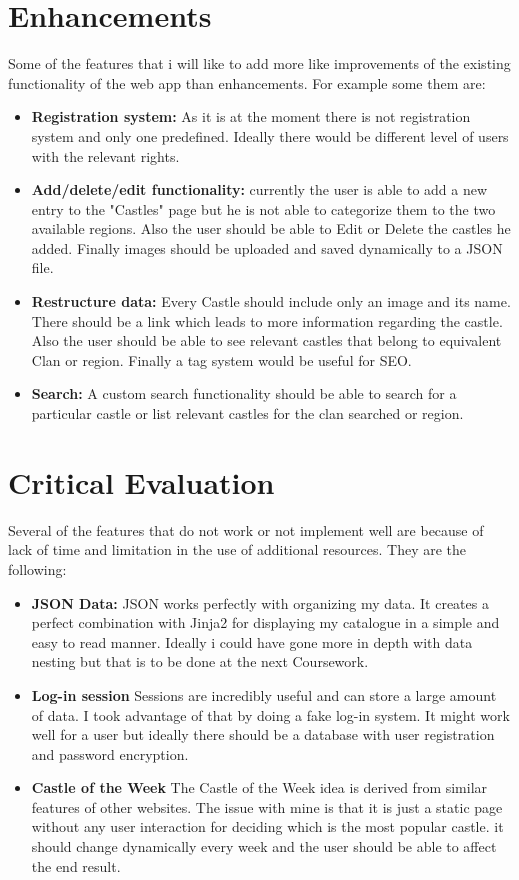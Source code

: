 \documentclass[10pt, a4paper]{article}
\begin{document}
	
	\section{Enhancements}
    
    Some of the features that i will like to add more like improvements of the existing functionality of the web app than enhancements. For  example some them are:
    \begin{itemize}
      \item \textbf{Registration system:} As it is at the moment there is not registration system and only one predefined. Ideally there would be different level of users with the relevant rights.
      \item \textbf{Add/delete/edit functionality:} currently the user is able to add a new entry to the "Castles" page but he is not able to categorize them to the two available regions. Also the user should be able to Edit or Delete the castles he added. Finally images should be uploaded and saved dynamically to a JSON file.
      \item \textbf{Restructure data:} Every Castle should include only an image and its name. There should be a link which leads to more information regarding the castle. Also the user should be able to see relevant castles that belong to equivalent Clan or region. Finally a tag system would be useful for SEO.
      \item \textbf{Search:} A custom search functionality should be able to search for a particular castle or list relevant castles for the clan searched or region.
    \end{itemize}
    
    
    
	\section{Critical Evaluation}
	
	Several of the features that do not work or not implement well are because of lack of time and limitation in the use of additional resources. They are the following:
	\begin{itemize}
	    \item \textbf{JSON Data:} JSON works perfectly with organizing my data. It creates a perfect combination with Jinja2 for displaying my catalogue in a simple and easy to read manner. Ideally i could have gone more in depth with data nesting but that is to be done at the next Coursework.
	    \item \textbf{Log-in session} Sessions are incredibly useful and can store a large amount of data. I took advantage of that by doing a fake log-in system. It might work well for a user but ideally there should be a database with user registration and password encryption. 
	    \item \textbf{Castle of the Week} The Castle of the Week idea is derived from similar features of other websites. The issue with mine is that it is just a static page without any user interaction for deciding which is the most popular castle. it should change dynamically every week and the user should be able to affect the end result. 
	\end{itemize}
\end{document}
